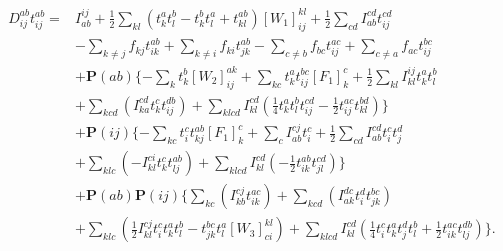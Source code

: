 \documentclass[graybox,sectrefs,envcountresetchap,open=right]{svmonodo}
\begin{document}
\begin{align}
D_{ij}^{ab} t_{ij}^{ab} = & 
I_{ab}^{ij}
+ \frac{1}{2} \sum_{kl} (t_k^a t_l^b - t_k^b t_l^a + t_{kl}^{ab}) [W_1]_{ij}^{kl}
+ \frac{1}{2} \sum_{cd} I_{ab}^{cd} t_{ij}^{cd}
 \nonumber \\ &
- \sum_{k \not= j} f_{kj} t_{ik}^{ab} 
+ \sum_{k \not= i} f_{ki} t_{jk}^{ab}
- \sum_{c \not= b} f_{bc} t_{ij}^{ac}
+ \sum_{c \not= a} f_{ac} t_{ij}^{bc}
 \nonumber \\ &
+ \mathbf{P}(ab) 
\{
- \sum_k t_k^b [W_2]_{ij}^{ak}
+ \sum_{kc} t_k^a t_{ij}^{bc} [F_1]_k^c
+ \frac{1}{2} \sum_{kl} I_{kl}^{ij} t_k^a t_l^b 
\nonumber \\ &
+ \sum_{kcd} 
(
I_{ka}^{cd} t_k^c t_{ij}^{db} 
)
+ \sum_{klcd} I_{kl}^{cd} 
(
\frac{1}{4} t_k^a t_l^b t_{ij}^{cd} 
- \frac{1}{2} t_{ij}^{ac} t_{kl}^{bd}
)
\}
\nonumber \\ &
+ \mathbf{P}(ij)
\{
- \sum_{kc} t_i^c t_{kj}^{ab} [F_1]_k^c
+ \sum_c I_{ab}^{cj} t_i^c
+ \frac{1}{2} \sum_{cd} I_{ab}^{cd} t_i^c t_j^d 
\nonumber \\ &
+ \sum_{klc}
( 
- I_{kl}^{ci} t_k^c t_{lj}^{ab}
)
+ \sum_{klcd} I_{kl}^{cd}
(
- \frac{1}{2} t_{ik}^{ab} t_{jl}^{cd}
)
\}
\nonumber \\ &
+ \mathbf{P}(ab) \mathbf{P}(ij)
\{
\sum_{kc}
(
I_{kb}^{cj} t_{ik}^{ac}
)
+ \sum_{kcd}
(
I_{ak}^{dc} t_i^d t_{jk}^{bc}
)
\nonumber \\ &
+ \sum_{klc}
(
\frac{1}{2} I_{kl}^{cj} t_i^c t_k^a t_l^b
- t_{jk}^{bc} t_l^a [W_3]_{ci}^{kl}
)
+ \sum_{klcd} I_{kl}^{cd}
(
\frac{1}{4} t_i^c t_k^a t_j^d t_l^b
+ \frac{1}{2} t_{ik}^{ac} t_{lj}^{db} 
)
\} .
\end{align}
\end{document}
